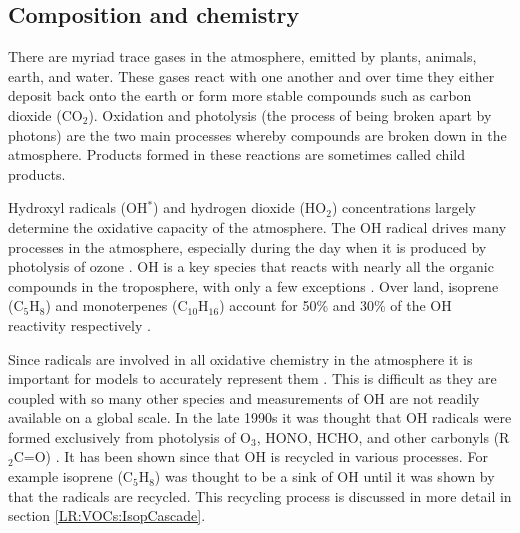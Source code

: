     
  \subsection{Composition and chemistry}
  \label{LR:Atmos:Chem}
        
    There are myriad trace gases in the atmosphere, emitted by plants, animals, 
    earth, and water. 
    These gases react with one another and over time they either deposit back 
    onto the earth or form more stable compounds such as carbon dioxide 
    (CO$_2$).
    Oxidation and photolysis (the process of being broken apart by photons) are the two main processes whereby compounds are broken down in the atmosphere.
    Products formed in these reactions are sometimes called child products.
    
    Hydroxyl radicals (OH$^*$) and hydrogen dioxide (HO$_2$) concentrations 
    largely determine the oxidative capacity of the atmosphere.
    The OH radical drives many processes in the atmosphere, especially during 
    the day when it is produced by photolysis of ozone \parencite{Atkinson2000}.
    OH is a key species that reacts with nearly all the organic compounds in the troposphere, with only a few exceptions \parencite{Atkinson2000}.
    Over land, isoprene (C$_5$H$_8$) and monoterpenes (C$_{10}$H$_{16}$) account for 50\% and 30\% of the OH reactivity respectively \parencite{Fuentes2000}.
    
    Since radicals are involved in all oxidative chemistry in the atmosphere it 
    is important for models to accurately represent them 
    \parencite[e.g.,][]{Travis2016}.
    This is difficult as they are coupled with so many other species and measurements of OH are not readily available on a global scale.
    In the late 1990s it was thought that OH radicals were formed exclusively 
    from photolysis of O$_3$, HONO, HCHO, and other carbonyls (R$_2$C=O) 
    \parencite{Atkinson2000}.
    It has been shown since that OH is recycled in various processes.
    For example isoprene (C$_5$H$_8$) was thought to be a sink of OH until it 
    was shown by \textcite{Paulot2009b} that the radicals are recycled.
    This recycling process is discussed in more detail in section \ref{LR:VOCs:IsopCascade}.
    
